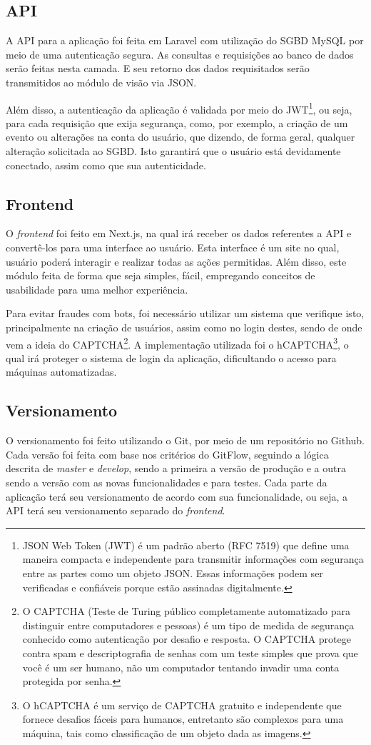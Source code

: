 \subsection{API}
A API para a aplicação foi feita em Laravel com utilização do SGBD MySQL por meio de uma autenticação segura. As consultas e requisições ao banco de dados serão feitas nesta camada. E seu retorno dos dados requisitados serão transmitidos ao módulo de visão via JSON.

Além disso, a autenticação da aplicação é validada por meio do JWT\footnote{JSON Web Token (JWT) é um padrão aberto (RFC 7519) que define uma maneira compacta e independente para transmitir informações com segurança entre as partes como um objeto JSON. Essas informações podem ser verificadas e confiáveis porque estão assinadas digitalmente.}, ou seja, para cada requisição que exija segurança, como, por exemplo, a criação de um evento ou alterações na conta do usuário, que dizendo, de forma geral, qualquer alteração solicitada ao SGBD. Isto garantirá que o usuário está devidamente conectado, assim como que sua autenticidade.

\subsection{Frontend}
O \textit{frontend} foi feito em Next.js, na qual irá receber os dados referentes a API e convertê-los para uma interface ao usuário. Esta interface é um site no qual, usuário poderá interagir e realizar todas as ações permitidas. Além disso, este módulo feita de forma que seja simples, fácil, empregando conceitos de usabilidade para uma melhor experiência.

Para evitar fraudes com bots, foi necessário utilizar um sistema que verifique isto, principalmente na criação de usuários, assim como no login destes, sendo de onde vem a ideia do CAPTCHA\footnote{O CAPTCHA (Teste de Turing público completamente automatizado para distinguir entre computadores e pessoas) é um tipo de medida de segurança conhecido como autenticação por desafio e resposta. O CAPTCHA protege contra spam e descriptografia de senhas com um teste simples que prova que você é um ser humano, não um computador tentando invadir uma conta protegida por senha.}. A implementação utilizada foi o hCAPTCHA\footnote{O hCAPTCHA é um serviço de CAPTCHA gratuito e independente que fornece desafios fáceis para humanos, entretanto são complexos para uma máquina, tais como classificação de um objeto dada as imagens.}, o qual irá proteger o sistema de login da aplicação, dificultando o acesso para máquinas automatizadas.

\subsection{Versionamento}
O versionamento foi feito utilizando o Git, por meio de um repositório no Github. Cada versão foi feita com base nos critérios do GitFlow, seguindo a lógica descrita de \textit{master} e \textit{develop}, sendo a primeira a versão de produção e a outra sendo a versão com as novas funcionalidades e para testes. Cada parte da aplicação terá seu versionamento de acordo com sua funcionalidade, ou seja, a API terá seu versionamento separado do \textit{frontend}.